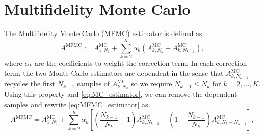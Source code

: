 \documentclass[final,3p,times,11pt]{elsarticle}
\begin{document}
\section{Multifidelity Monte Carlo}
The Multifidelity Monte Carlo (MFMC) estimator is defined as
\begin{equation}\label{eq:MFMC_estimator}
    A^{\text{MFMC}} := A^{\text{MC}}_{1,N_1} + \sum_{k=2}^K \alpha_k\left(A^{\text{MC}}_{k,N_k} - A^{\text{MC}}_{k,N_{k-1}} \right),
\end{equation}
where $\alpha_k$ are the coefficients to weight the correction term. In each correction term, the two Monte Carlo estimators are dependent in the sense that $A^{\text{MC}}_{k,N_{k-1}}$ recycles the first $N_{k-1}$ samples of $A^{\text{MC}}_{k,N_{k}}$ so we require $N_{k-1}\le N_k$ for $k=2,\ldots,K$. Using this property and \eqref{eq:MC_estimator}, we can remove the dependent samples and rewrite \eqref{eq:MFMC_estimator} as
\begin{equation}\label{eq:MFMC_estimator_independent}
    A^{\text{MFMC}} = A^{\text{MC}}_{1,N_1} +  \sum_{k=2}^K \alpha_k\left[\left(\frac{N_{k-1}}{N_{k}}-1\right)A_{k,N_{k-1}}^{\text{MC}}+\left(1-\frac{N_{k-1}}{N_{k}}\right) A_{k,N_k-N_{k-1}}^{\text{MC}}\right],
\end{equation}
\end{document}
